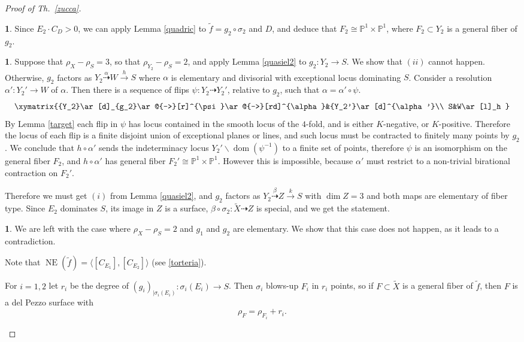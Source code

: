\documentclass[a4paper,12pt]{amsart}
\theoremstyle{definition}
\newtheorem{prg}[thm]{}
\numberwithin{figure}{section}
\numberwithin{table}{section}
\newcommand{\w}{\widetilde}
\newcommand{\pr}{\mathbb{P}}
\newcommand{\dom}{\operatorname{dom}}
\newcommand{\NE}{\operatorname{NE}}
\begin{document}
\begin{proof}[Proof of Th.~\ref{zucca}]
\begin{prg}
  Since $E_2\cdot C_D>0$, we can apply
  Lemma \ref{quadric} to $\tilde{f}=g_2\circ\sigma_2$ and $D$, and deduce that  $F_{2}\cong\pr^1\times\pr^1$, where $F_2\subset Y_2$ is a general fiber of $g_2$.
\end{prg}
\begin{prg} Suppose that $\rho_X-\rho_S=3$, so that
  $\rho_{Y_2}-\rho_S=2$, and apply Lemma \ref{quasiel2} to $g_2\colon Y_2\to S$.
  We show that $(ii)$ cannot happen. Otherwise, $g_2$ factors as  $Y_2\stackrel{\alpha}{\dasharrow} W\stackrel{h}{\to} S$ where $\alpha$ is elementary and divisorial with exceptional locus dominating $S$. Consider
a resolution $\alpha'\colon Y_2'\to W$ of $\alpha$. Then there is a sequence of flips $\psi\colon Y_2\dasharrow Y_2'$, relative to $g_2$, such that 
$\alpha=\alpha'\circ\psi$.
$$\xymatrix{{Y_2}\ar[d]_{g_2}\ar@{-->}[r]^{\psi}\ar@{-->}[rd]^{\alpha}&{Y_2'}\ar[d]^{\alpha'}\\
  S&W\ar[l]_h
  }$$
By Lemma \ref{target} each flip in $\psi$ has locus contained in the smooth locus of the $4$-fold, and is either $K$-negative, or $K$-positive. Therefore the locus of each flip is a finite disjoint union of exceptional planes or lines, and such locus must be contracted to finitely many points by $g_2$. We conclude that $h\circ\alpha'$ sends the indeterminacy locus $Y_2'\smallsetminus\dom(\psi^{-1})$ to a finite set of points, therefore $\psi$ is an isomorphism on the general fiber $F_2$, and 
$h\circ\alpha'$ has general fiber $F_2'\cong \pr^1\times\pr^1$. However this is impossible, because $\alpha'$ must restrict to a non-trivial birational contraction on $F_2'$. 

Therefore we must get $(i)$ from Lemma \ref{quasiel2},
  and $g_2$ factors as
  $Y_2\stackrel{\beta}{\dasharrow} Z\stackrel{k}{\to} S$
  with $\dim Z=3$ and both maps are elementary  of fiber type. 
Since $E_2$ dominates $S$, its image in $Z$ is a surface, $\beta\circ\sigma_2\colon \w{X}\dasharrow Z$ is special,
   and we get the statement.
  \end{prg}
\begin{prg}
  We are left with the case where $\rho_X-\rho_S=2$ and $g_1$ and
  $g_2$ are elementary. We show that this case does not happen, as it leads to a contradiction.

  Note that $\NE(\tilde{f})=\langle [C_{E_1}],[C_{E_2}]\rangle$ (see \ref{torteria}).

 For $i=1,2$ let $r_i$ be the degree of $(g_i)_{| \sigma_i(E_i)}\colon \sigma_i(E_i)\to S$. Then $\sigma_i$ blows-up $F_i$ in $r_i$ points, so if $F\subset\w{X}$ is a general fiber of $\tilde{f}$, then $F$ is a del Pezzo surface with
  \begin{equation}\label{rhoF}
    \rho_F=\rho_{F_i}+r_i.
    \end{equation}


\end{prg}
\end{proof}
\end{document}
